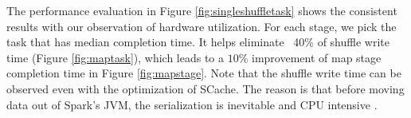 
The performance evaluation in Figure \ref{fig:singleshuffletask} shows the consistent results with our observation of hardware utilization. 
For each stage, we pick the task that has median completion time. 
It helps eliminate ~40\% of shuffle write time (Figure \ref{fig:maptask}), which leads to a $10\%$ improvement of map stage completion time in Figure \ref{fig:mapstage}. 
Note that the shuffle write time can be observed even with the optimization of SCache. 
The reason is that before moving data out of Spark's JVM, the serialization is inevitable and CPU intensive \cite{makingsense}. 

